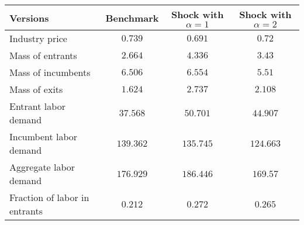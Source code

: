 \begin{tabular}{lccc}
\toprule 
Versions & Benchmark & Shock with $\alpha = 1$ & Shock with $\alpha = 2$\\
\toprule
Industry price & $0.739$ & $0.691$ & $0.72$\\
Mass of entrants & $2.664$ & $4.336$ & $3.43$\\
Mass of incumbents & $6.506$ & $6.554$ & $5.51$\\
Mass of exits & $1.624$ & $2.737$ & $2.108$\\
Entrant labor demand & $37.568$ & $50.701$ & $44.907$\\
Incumbent labor demand & $139.362$ & $135.745$ & $124.663$\\
Aggregate labor demand & $176.929$ & $186.446$ & $169.57$\\
Fraction of labor in entrants & $0.212$ & $0.272$ & $0.265$\\
\end{tabular}
